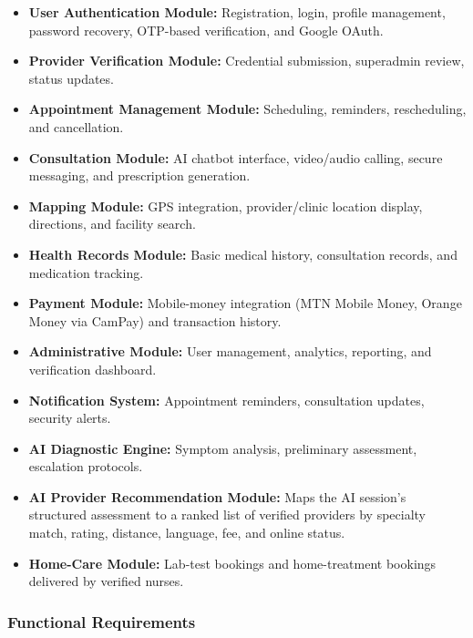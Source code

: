 \begin{itemize}
  \item \textbf{User Authentication Module:} Registration, login, profile management, password recovery, OTP-based verification, and Google OAuth.
  \item \textbf{Provider Verification Module:} Credential submission, superadmin review, status updates.
  \item \textbf{Appointment Management Module:} Scheduling, reminders, rescheduling, and cancellation.
  \item \textbf{Consultation Module:} AI chatbot interface, video/audio calling, secure messaging, and prescription generation.
  \item \textbf{Mapping Module:} GPS integration, provider/clinic location display, directions, and facility search.
  \item \textbf{Health Records Module:} Basic medical history, consultation records, and medication tracking.
  \item \textbf{Payment Module:} Mobile-money integration (MTN Mobile Money, Orange Money via CamPay) and transaction history.
  \item \textbf{Administrative Module:} User management, analytics, reporting, and verification dashboard.
  \item \textbf{Notification System:} Appointment reminders, consultation updates, security alerts.
  \item \textbf{AI Diagnostic Engine:} Symptom analysis, preliminary assessment, escalation protocols.
  \item \textbf{AI Provider Recommendation Module:} Maps the AI session's structured assessment to a ranked list of verified providers by specialty match, rating, distance, language, fee, and online status.
  \item \textbf{Home-Care Module:} Lab-test bookings and home-treatment bookings delivered by verified nurses.
\end{itemize}

\subsubsection*{Functional Requirements}

